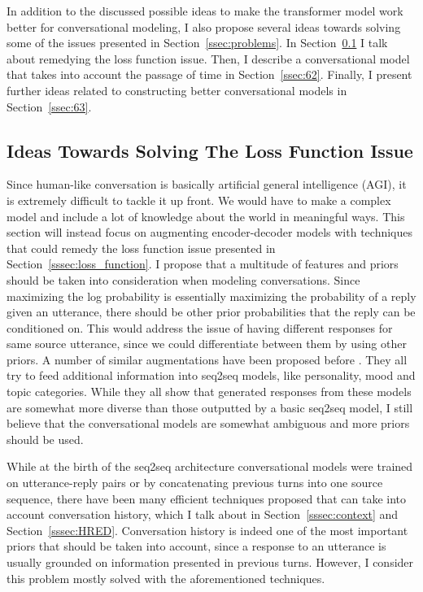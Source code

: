 \documentclass[12pt]{article}
\begin{document}
In addition to the discussed possible ideas to make the transformer model work better for conversational modeling, I also propose several ideas towards solving some of the issues presented in Section~\ref{ssec:problems}. In Section~\ref{ssec:61} I talk about remedying the loss function issue. Then, I describe a conversational model that takes into account the passage of time in Section~\ref{ssec:62}. Finally, I present further ideas related to constructing better conversational models in Section~\ref{ssec:63}.
\subsection{Ideas Towards Solving The Loss Function Issue} \label{ssec:61}
Since human-like conversation is basically artificial general intelligence (AGI), it is extremely difficult to tackle it up front. We would have to make a complex model and include a lot of knowledge about the world in meaningful ways. This section will instead focus on augmenting encoder-decoder models with techniques that could remedy the loss function issue presented in Section~\ref{sssec:loss_function}. I propose that a multitude of features and priors should be taken into consideration when modeling conversations. Since maximizing the log probability is essentially maximizing the probability of a reply given an utterance, there should be other prior probabilities that the reply can be conditioned on. This would address the issue of having different responses for same source utterance, since we could differentiate between them by using other priors. A number of similar augmentations have been proposed before \cite{Li:2016,Xing_topic:2017,Zhou:2017,Choudhary:2017}. They all try to feed additional information into seq2seq models, like personality, mood and topic categories. While they all show that generated responses from these models are somewhat more diverse than those outputted by a basic seq2seq model, I still believe that the conversational models are somewhat ambiguous and more priors should be used.

While at the birth of the seq2seq architecture conversational models were trained on utterance-reply pairs or by concatenating previous turns into one source sequence, there have been many efficient techniques proposed that can take into account conversation history, which I talk about in Section~\ref{sssec:context} and Section~\ref{sssec:HRED}. Conversation history is indeed one of the most important priors that should be taken into account, since a response to an utterance is usually grounded on information presented in previous turns. However, I consider this problem mostly solved with the aforementioned techniques.
\end{document}
